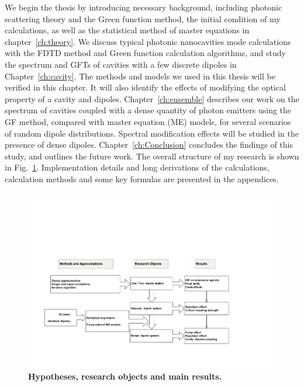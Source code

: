 We begin the thesis by introducing necessary background, including photonic scattering theory and the Green function method, the initial condition of my calculations, as well as the statistical method of master equations in
chapter~\ref{ch:theory}. We discuss typical photonic nanocavities mode calculations with the FDTD method and Green function calculation algorithms, and study the spectrum and GFTs of cavities with a few discrete dipoles in Chapter~\ref{ch:cavity}. The methods and models we used in this thesis will be verified in this chapter. It will also identify the effects of modifying the optical property of a cavity and dipoles. Chapter~\ref{ch:ensemble} describes our work on the spectrum of cavities coupled with a dense quantity of photon emitters using the GF method, compared with master equation (ME) models, for several scenarios of random dipole distributions. Spectral modification effects will be studied in the presence of dense dipoles.
Chapter~\ref{ch:Conclusion} concludes the findings of this study, and outlines the future work. The overall structure of my research is shown in Fig.~\ref{MainStructure}.
Implementation details and long derivations of the calculations, calculation methods and some key formulas are presented in the appendices.

\begin{figure}[htp]%
\centering
\begin{center}
\includegraphics[width=16cm]{./Figs/MainStructure}%
\end{center}
\caption[Hypotheses, research objects and main results.]{\textbf{Hypotheses, research objects and main results.} }
\label{MainStructure}
\end{figure} 